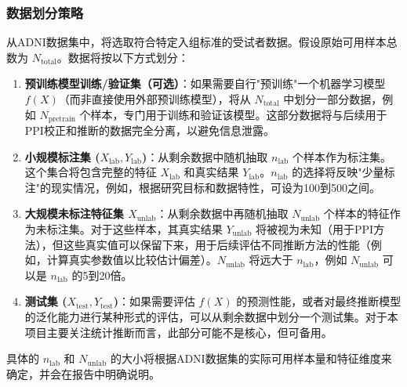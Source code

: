 \documentclass[12pt,a4paper]{article}
\begin{document}
\subsubsection{数据划分策略}
\label{sec:data_splitting}
从ADNI数据集中，将选取符合特定入组标准的受试者数据。假设原始可用样本总数为 $N_{\text{total}}$。数据将按以下方式划分：
\begin{enumerate}
    \item \textbf{预训练模型训练/验证集（可选）}：如果需要自行"预训练"一个机器学习模型 $f(X)$（而非直接使用外部预训练模型），将从 $N_{\text{total}}$ 中划分一部分数据，例如 $N_{\text{pretrain}}$ 个样本，专门用于训练和验证该模型。这部分数据将与后续用于PPI校正和推断的数据完全分离，以避免信息泄露。
    \item \textbf{小规模标注集 ($X_{\text{lab}},Y_{\text{lab}}$)}：从剩余数据中随机抽取 $n_{\text{lab}}$ 个样本作为标注集。这个集合将包含完整的特征 $X_{\text{lab}}$ 和真实结果 $Y_{\text{lab}}$。$n_{\text{lab}}$ 的选择将反映"少量标注"的现实情况，例如，根据研究目标和数据特性，可设为100到500之间。
    \item \textbf{大规模未标注特征集 $X_{\text{unlab}}$}：从剩余数据中再随机抽取 $N_{\text{unlab}}$ 个样本的特征作为未标注集。对于这些样本，其真实结果 $Y_{\text{unlab}}$ 将被视为未知（用于PPI方法），但这些真实值可以保留下来，用于后续评估不同推断方法的性能（例如，计算真实参数值以比较估计偏差）。$N_{\text{unlab}}$ 将远大于 $n_{\text{lab}}$，例如 $N_{\text{unlab}}$ 可以是 $n_{\text{lab}}$ 的5到20倍。
    \item \textbf{测试集 ($X_{\text{test}},Y_{\text{test}}$)}：如果需要评估 $f(X)$ 的预测性能，或者对最终推断模型的泛化能力进行某种形式的评估，可以从剩余数据中划分一个测试集。对于本项目主要关注统计推断而言，此部分可能不是核心，但可备用。
\end{enumerate}
具体的 $n_{\text{lab}}$ 和 $N_{\text{unlab}}$ 的大小将根据ADNI数据集的实际可用样本量和特征维度来确定，并会在报告中明确说明。
\end{document}

